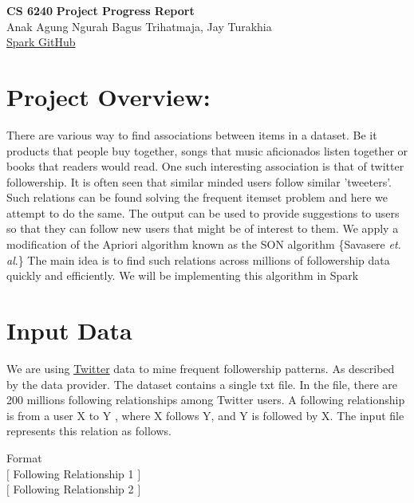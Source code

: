 \documentclass[11pt]{article}
\begin{document}
    \thispagestyle{empty}
    \setlength{\parindent}{0pt}
    \setlength{\parskip}{1.8ex}
    \lstset{language=Scala}
    \newcommand{\hs}{\hspace{.1in}}

    \begin{center}
        \Large{\bf CS 6240}
        \Large{\bf Project Progress Report\\}
        \Large{Anak Agung Ngurah Bagus Trihatmaja, Jay Turakhia\\}
        \href{https://github.ccs.neu.edu/prdx/CS6240-Project}{Spark GitHub}  \\
    \end{center}
    \medskip

\section{Project Overview: }
There are various way to find associations between items in a dataset. Be it products that people buy together, songs that music aficionados listen together or books that readers would read. One such interesting association is that of twitter followership. It is often seen that similar minded users follow similar 'tweeters'.\\
Such relations can be found solving the frequent itemset problem and here we attempt to do the same. The output can be used to provide suggestions to users so that they can follow new users that might be of interest to them. We apply a modification of the Apriori algorithm known as the SON algorithm \{Savasere \textit  {et. al}.\} The main idea is to find such relations across millions of followership data quickly and efficiently. We will be implementing this algorithm in Spark\\

\section{Input Data}
We are using \href{https://wiki.illinois.edu//wiki/display/forward/Dataset-UDI-TwitterCrawl-Aug2012}{Twitter} data to mine frequent followership patterns. As described by the data provider.
The dataset contains a single txt file. 
In the file, there are 200 millions following relationships among Twitter users. A following relationship is from a user X to Y , where X follows Y, and Y is followed by X. The input file represents this relation as follows.

Format\\
$\big[$ Following Relationship 1 $\big]$\\
$\big[$ Following Relationship 2 $\big]$\\
\end{document}
